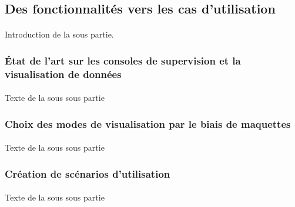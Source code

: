 			\paragraph{}%
			
			\paragraph{}%
	
	\subsection{Des fonctionnalités vers les cas d'utilisation}
		\paragraph{}
		Introduction de la sous partie.
		
		\subsubsection{État de l'art sur les consoles de supervision et la visualisation de données}
			\paragraph{}
			Texte de la sous sous partie
		\subsubsection{Choix des modes de visualisation par le biais de maquettes}
			\paragraph{}
			Texte de la sous sous partie
		\subsubsection{Création de scénarios d'utilisation}
			\paragraph{}
			Texte de la sous sous partie
